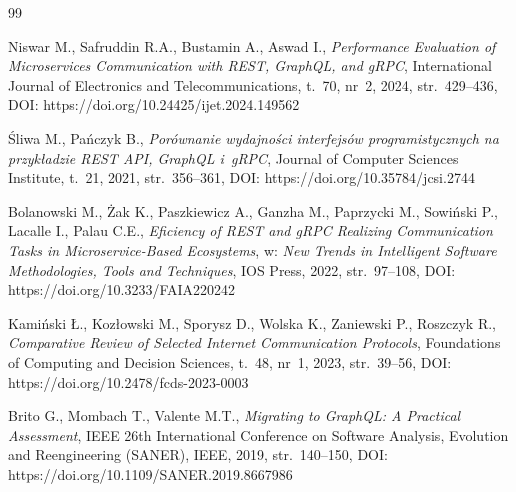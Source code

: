 \documentclass{PracaDyplomowa}
\begin{document}
\cleardoublepage
\begin{thebibliography}{99}
\raggedright
\enlargethispage{2\baselineskip}



 Niswar M., Safruddin R.A., Bustamin A., Aswad I., \textit{Performance Evaluation of Microservices Communication with REST, GraphQL, and gRPC}, International Journal of Electronics and Telecommunications, t.~70, nr~2, 2024, str.~429--436, DOI: https://doi.org/10.24425/ijet.2024.149562

 Śliwa M., Pańczyk B., \textit{Porównanie wydajności interfejsów programistycznych na przykładzie REST API, GraphQL i~gRPC}, Journal of Computer Sciences Institute, t.~21, 2021, str.~356--361, DOI: https://doi.org/10.35784/jcsi.2744

 Bolanowski M., Żak K., Paszkiewicz A., Ganzha M., Paprzycki M., Sowiński P., Lacalle I., Palau C.E., \textit{Eficiency of REST and gRPC Realizing Communication Tasks in Microservice-Based Ecosystems}, w: \textit{New Trends in Intelligent Software Methodologies, Tools and Techniques}, IOS Press, 2022, str.~97--108, DOI: https://doi.org/10.3233/FAIA220242

 Kamiński Ł., Kozłowski M., Sporysz D., Wolska K., Zaniewski P., Roszczyk R., \textit{Comparative Review of Selected Internet Communication Protocols}, Foundations of Computing and Decision Sciences, t.~48, nr~1, 2023, str.~39--56, DOI: https://doi.org/10.2478/fcds-2023-0003

 Brito G., Mombach T., Valente M.T., \textit{Migrating to GraphQL: A Practical Assessment}, IEEE 26th International Conference on Software Analysis, Evolution and Reengineering (SANER), IEEE, 2019, str.~140--150, DOI: https://doi.org/10.1109/SANER.2019.8667986


\end{thebibliography}
\end{document}
